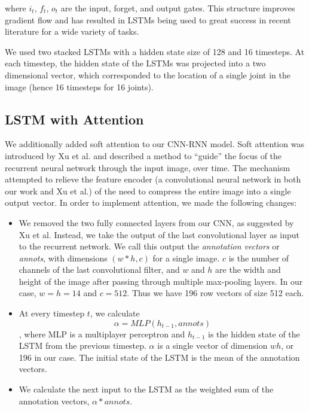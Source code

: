 \documentclass[11pt,twocolumn,letterpaper]{article}
\begin{document}
where $i_t$, $f_t$, $o_t$ are the input, forget, and output gates. This structure
improves gradient flow and has resulted in LSTMs being used to great success in recent literature
for a wide variety of tasks. 

We used two stacked LSTMs with a hidden state size of 128 and 16 timesteps. At each timestep,
the hidden state of the LSTMs was projected into a two dimensional vector, which 
corresponded to the location of a single joint in the image (hence 16 timesteps for 16 joints).

\subsection{LSTM with Attention}

We additionally added soft attention to our CNN-RNN model. Soft attention
was introduced by Xu et al. \cite{xu2015show} and described a method to ``guide''
the focus of the recurrent neural network through the input image, over time. The
mechanism attempted to relieve the feature encoder (a convolutional neural network in
both our work and Xu et al.) of the need to compress the entire image into a single
output vector. In order to implement attention, we made the following changes:

\begin{itemize}
    \item We removed the two fully connected layers from our CNN, as suggested by
        Xu et al. Instead, we take the output of the last convolutional layer
        as input to the recurrent network. We call this output
        the \textit{annotation vectors} or \textit{annots},
        with dimensions $(w*h, c)$ for a single image. $c$ is the number of channels of
        the last convolutional filter, and $w$ and $h$ are the width and height of
        the image after passing through multiple max-pooling layers. In our case,
        $w = h = 14$ and $c = 512$. Thus we have 196 row vectors of size 512 each.

    \item At every timestep $t$, we calculate $$\alpha = MLP(h_{t-1}, annots)$$,
        where MLP is a multiplayer perceptron and $h_{t-1}$ is the hidden state of the
        LSTM from the previous timestep. $\alpha$ is a single vector of dimension $wh$, or
        196 in our case. The initial state of the LSTM is the mean of the annotation vectors.

    \item We calculate the next input to the LSTM as the weighted sum of the annotation
        vectors, $\alpha * annots$. 
\end{itemize}
\end{document}
